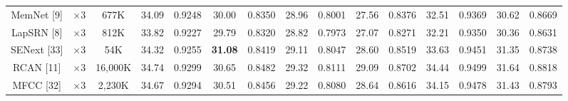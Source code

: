 \documentclass{ieeeaccess}
\begin{document}
\begin{table}
\begin{tabular}{|c|c|c|cc|cc|cc|cc|cc|cc|}
MemNet [9] & $\times3$ &677K& \multicolumn{1}{c|}{34.09} &0.9248  & \multicolumn{1}{c|}{30.00} &0.8350  &\multicolumn{1}{c|}{28.96} & 0.8001 & \multicolumn{1}{c|}{27.56} & 0.8376 & \multicolumn{1}{c|}{32.51} &0.9369
&\multicolumn{1}{c|}{ 30.62} &0.8669\\

LapSRN [8] &$\times3$ &812K& \multicolumn{1}{c|}{33.82} & 0.9227  & \multicolumn{1}{c|}{29.79} & 0.8320  &\multicolumn{1}{c|}{28.82} & 0.7973  & \multicolumn{1}{c|}{27.07} & 0.8271 & \multicolumn{1}{c|}{32.21} & 0.9350
&\multicolumn{1}{c|}{30.36} & 0.8631\\

SENext [33] & $\times3$ &54K& \multicolumn{1}{c|}{34.32} &{0.9255}& \multicolumn{1}{c|}{\color{red}\textbf{31.08}} & {0.8419} & \multicolumn{1}{c|}{29.11} &{0.8047}& \multicolumn{1}{c|}{28.60} &{0.8519}& \multicolumn{1}{c|}{33.63} &{0.9451} &\multicolumn{1}{c|}{31.35} &{0.8738} \\


RCAN [11]& $\times3$ &16,000K& \multicolumn{1}{c|}{34.74} & 0.9299 & \multicolumn{1}{c|}{30.65} & 0.8482 &\multicolumn{1}{c|}{29.32} & 0.8111& \multicolumn{1}{c|}{29.09} & 0.8702 & \multicolumn{1}{c|}{34.44} & 0.9499
&\multicolumn{1}{c|}{31.64} & 0.8818\\


MFCC [32]& $\times 3$&2,230K& \multicolumn{1}{c|}{34.67} & 0.9294 & \multicolumn{1}{c|}{30.51} &0.8456 &\multicolumn{1}{c|}{29.22} & 0.8080& \multicolumn{1}{c|}{28.64} & 0.8616 & \multicolumn{1}{c|}{34.15} & 0.9478
&\multicolumn{1}{c|}{31.43} & 0.8793\\



\end{tabular}
\end{table}
\end{document}
